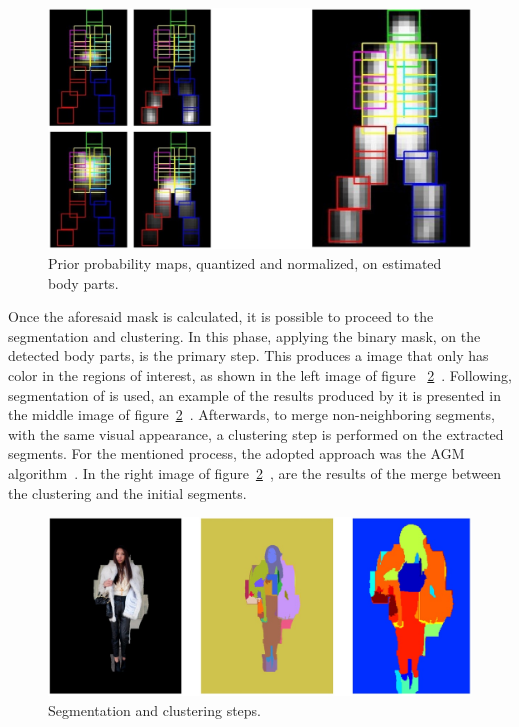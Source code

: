 \documentclass[titlepage,12pt,a4paper,times]{book}
\begin{document}
\begin{figure}[!h]
\centering
\includegraphics[scale=0.45]{images/2_4_fig2.jpg}
\caption{Prior probability maps, quantized and normalized, on estimated body
parts.}
\label{fig:ppm}
\end{figure}
\FloatBarrier

Once the aforesaid mask is calculated, it is possible to proceed to the
segmentation and clustering. In this phase, applying the binary mask, on the
detected body parts, is the primary step. This produces a image that only has
color in the regions of interest, as shown in the left image of figure
~\ref{fig:scs}~\citep{3}. Following, segmentation of \cite{9} is used, an
example of the results produced by it is presented in the middle image of
figure~\ref{fig:scs}~\citep{3}. Afterwards, to merge non-neighboring segments,
with the same visual appearance, a clustering step is performed on the extracted
segments. For the mentioned process, the adopted approach was the \ac{AGM}
algorithm~\citep{10}. In the right image of figure~\ref{fig:scs}~\citep{3}, are
the results of the merge between the clustering and the initial segments.


\begin{figure}[!h]
\centering
\includegraphics[scale=0.4]{images/2_4_fig3.jpg}
\caption{Segmentation and clustering steps.}
\label{fig:scs}
\end{figure}
\FloatBarrier
\end{document}
